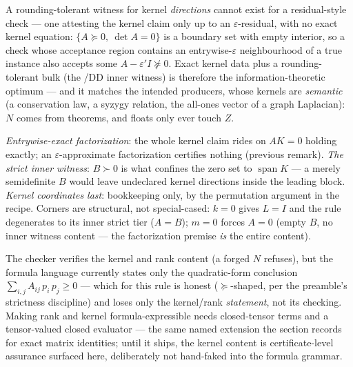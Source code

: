 \begin{bremark}
A rounding-tolerant witness for kernel \emph{directions} cannot exist
for a residual-style check --- one attesting the kernel claim only up
to an $\varepsilon$-residual, with no exact kernel equation:
$\{A \succcurlyeq 0,\ \det A = 0\}$ is a boundary set with empty
interior, so a check whose acceptance region contains an
entrywise-$\varepsilon$ neighbourhood of a true instance also accepts
some $A - \varepsilon' I \not\succcurlyeq 0$. Exact kernel data plus a
rounding-tolerant bulk (the /DD inner witness) is therefore the
information-theoretic optimum --- and it matches the intended
producers, whose kernels are \emph{semantic} (a conservation law, a
syzygy relation, the all-ones vector of a graph Laplacian): $N$ comes
from theorems, and floats only ever touch $Z$.
\end{bremark}

\begin{bremark}
\emph{Entrywise-exact factorization}: the whole kernel claim rides on
$A K = 0$ holding exactly; an $\varepsilon$-approximate factorization
certifies nothing (previous remark). \emph{The strict inner witness}:
$B \succ 0$ is what confines the zero set to
$\operatorname{span} K$ --- a merely semidefinite $B$ would leave
undeclared kernel directions inside the leading block. \emph{Kernel
coordinates last}: bookkeeping only, by the permutation argument in
the recipe. Corners are structural, not special-cased: $k = 0$ gives
$L = I$ and the rule degenerates to its inner strict tier ($A = B$);
$m = 0$ forces $A = 0$ (empty $B$, no inner witness content --- the
factorization premise \emph{is} the entire content).
\end{bremark}

\begin{bremark}
The checker verifies the kernel and rank content (a forged $N$
refuses), but the formula language currently states only the
quadratic-form conclusion $\sum_{i,j} A_{ij}\,p_i\,p_j \geq 0$ ---
which for this rule is honest ($\succcurlyeq$-shaped, per the
preamble's strictness discipline) and loses only the kernel/rank
\emph{statement}, not its checking. Making rank and kernel
formula-expressible needs closed-tensor terms and a tensor-valued
closed evaluator --- the same named extension the
 section records for exact matrix identities;
until it ships, the kernel content is certificate-level assurance
surfaced here, deliberately not hand-faked into the formula grammar.
\end{bremark}

